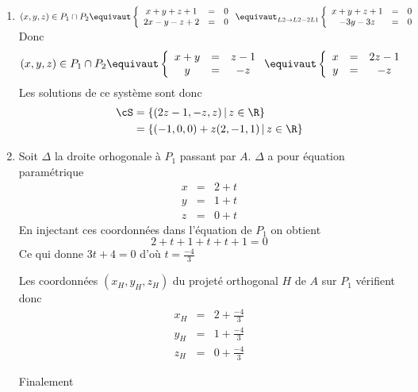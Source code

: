 \documentclass[a4paper, 11pt,reqno]{article}
\begin{document}
\begin{correction}
\begin{enumerate}
\item $(x,y,z)\in P_1\cap P_2 \equivaut \left\{ \begin{array}{ccc}
x+y+z+1&=&0\\
2x-y-z+2&=&0\\
\end{array}
\right. \equivaut_{L2\rightarrow L2-2L1} \left\{ \begin{array}{ccc}
x+y+z+1&=&0\\
-3y-3z&=&0\\
\end{array}
\right. $
Donc 
$$(x,y,z)\in P_1\cap P_2 \equivaut \left\{ \begin{array}{ccc}
x+y&=&z-1\\
y&=&-z\\
\end{array}
\right. 
\equivaut \left\{ \begin{array}{ccc}
x&=&2z-1\\
y&=&-z\\
\end{array}
\right.
$$ 
Les solutions de ce système sont donc 
\begin{align*}
\cS&=\{ (2z-1,-z, z)\, |\, z\in \R\}\\
&=\{ (-1,0,0) +z(2,-1, 1)\, |\, z\in \R\}
\end{align*}

\item Soit $\Delta$ la droite orhogonale à $P_1$ passant par $A$. $\Delta$  a pour équation paramétrique 
$$\begin{array}{ccc}
x&=&2+t\\
y&=&1+t\\
z&=&0+t
\end{array}$$
En injectant ces coordonnées dans l'équation de $P_1$ on obtient 
$$2+t +1+t +t +1=0$$
Ce qui donne $3t+4=0$ d'où $t=\frac{-4}{3}$

Les coordonnées $(x_H,y_H,z_H)$ du projeté orthogonal $H$ de $A$ sur $P_1$ vérifient donc 
$$\begin{array}{ccc}
x_H&=&2+\frac{-4}{3}\\
y_H&=&1+\frac{-4}{3}\\
z_H&=&0+\frac{-4}{3}
\end{array}$$

Finalement 



\end{enumerate}
\end{correction}
\end{document}
